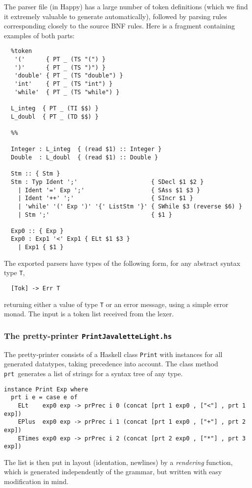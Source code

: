 \documentclass[10pt]{article}
\begin{document}
The parser file (in Happy) has a large number of token definitions
(which we find it extremely valuable to generate automatically),
followed by parsing rules corresponding closely to the source BNF rules.
Here is a fragment containing examples of both parts:
\small
\begin{verbatim}
  %token
   '('      { PT _ (TS "(") }
   ')'      { PT _ (TS ")") }
   'double' { PT _ (TS "double") }
   'int'    { PT _ (TS "int") }
   'while'  { PT _ (TS "while") }

  L_integ  { PT _ (TI $$) }
  L_doubl  { PT _ (TD $$) }

  %%

  Integer : L_integ  { (read $1) :: Integer }
  Double  : L_doubl  { (read $1) :: Double }

  Stm :: { Stm }
  Stm : Typ Ident ';'                     { SDecl $1 $2 }
    | Ident '=' Exp ';'                   { SAss $1 $3 }
    | Ident '++' ';'                      { SIncr $1 }
    | 'while' '(' Exp ')' '{' ListStm '}' { SWhile $3 (reverse $6) }
    | Stm ';'                             { $1 }

  Exp0 :: { Exp }
  Exp0 : Exp1 '<' Exp1 { ELt $1 $3 }
    | Exp1 { $1 }
\end{verbatim} %
\normalsize
The exported parsers have types of the following
form, for any abstract syntax type {\tt T},
\begin{verbatim}
  [Tok] -> Err T
\end{verbatim}
returning either a value of type {\tt T} or an error message, using
a simple error monad. The input is a token list received from the lexer.


\subsubsection{The pretty-printer {\tt PrintJavaletteLight.hs}}

The pretty-printer consists of a Haskell class {\tt Print} with instances
for all generated datatypes, taking precedence into account. The class method
{\tt prt}\
generates a list of strings for a syntax tree of any type.
\small
\begin{verbatim}
instance Print Exp where
  prt i e = case e of
    ELt    exp0 exp -> prPrec i 0 (concat [prt 1 exp0 , ["<"] , prt 1 exp])
    EPlus  exp0 exp -> prPrec i 1 (concat [prt 1 exp0 , ["+"] , prt 2 exp])
    ETimes exp0 exp -> prPrec i 2 (concat [prt 2 exp0 , ["*"] , prt 3 exp])
\end{verbatim}
\normalsize
The list is then put in layout (identation, newlines) by a \textit{rendering}
function, which is generated independently of the grammar,
but written with easy modification in mind.
\end{document}
